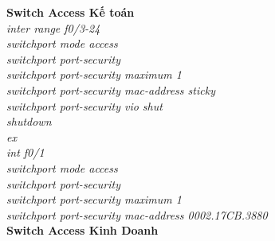 \documentclass[a4paper, 12pt]{article}
\begin{document}
\hspace*{1cm}\textbf{Switch Access Kế toán}\\
\hspace*{2cm}\textit{inter range f0/3-24\\
\hspace*{2cm}switchport mode access\\
\hspace*{2cm}switchport port-security\\
\hspace*{2cm}switchport port-security maximum 1\\
\hspace*{2cm}switchport port-security mac-address sticky\\
\hspace*{2cm}switchport port-security vio shut\\
\hspace*{2cm}shutdown\\
\hspace*{2cm}ex\\
\hspace*{2cm}int f0/1\\
\hspace*{2cm}switchport mode access\\
\hspace*{2cm}switchport port-security\\
\hspace*{2cm}switchport port-security maximum 1\\
\hspace*{2cm}switchport port-security mac-address 0002.17CB.3880\\}
\hspace*{1cm}\textbf{Switch Access Kinh Doanh}\\
\end{document}
